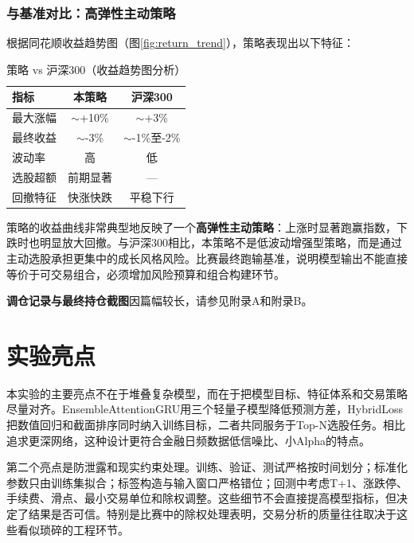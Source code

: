 \documentclass[10pt,a4paper]{ctexart}
\begin{document}
\subsubsection{与基准对比：高弹性主动策略}

根据同花顺收益趋势图（图\ref{fig:return_trend}），策略表现出以下特征：

\begin{table}[htbp]
    \centering
    \caption{策略 vs 沪深300（收益趋势图分析）}
    \begin{tabular}{lcc}
        \toprule
        指标 & 本策略 & 沪深300 \\
        \midrule
        最大涨幅 & $\sim$+10\% & $\sim$+3\% \\
        最终收益 & $\sim$-3\% & $\sim$-1\%至-2\% \\
        波动率 & 高 & 低 \\
        选股超额 & 前期显著 & --- \\
        回撤特征 & 快涨快跌 & 平稳下行 \\
        \bottomrule
    \end{tabular}
\end{table}

策略的收益曲线非常典型地反映了一个\textbf{高弹性主动策略}：上涨时显著跑赢指数，下跌时也明显放大回撤。与沪深300相比，本策略不是低波动增强型策略，而是通过主动选股承担更集中的成长风格风险。比赛最终跑输基准，说明模型输出不能直接等价于可交易组合，必须增加风险预算和组合构建环节。

\noindent\textbf{调仓记录与最终持仓截图}因篇幅较长，请参见附录A和附录B。

\section{实验亮点}

本实验的主要亮点不在于堆叠复杂模型，而在于把模型目标、特征体系和交易策略尽量对齐。EnsembleAttentionGRU用三个轻量子模型降低预测方差，HybridLoss把数值回归和截面排序同时纳入训练目标，二者共同服务于Top-N选股任务。相比追求更深网络，这种设计更符合金融日频数据低信噪比、小Alpha的特点。

第二个亮点是防泄露和现实约束处理。训练、验证、测试严格按时间划分；标准化参数只由训练集拟合；标签构造与输入窗口严格错位；回测中考虑T+1、涨跌停、手续费、滑点、最小交易单位和除权调整。这些细节不会直接提高模型指标，但决定了结果是否可信。特别是比赛中的除权处理表明，交易分析的质量往往取决于这些看似琐碎的工程环节。
\end{document}
